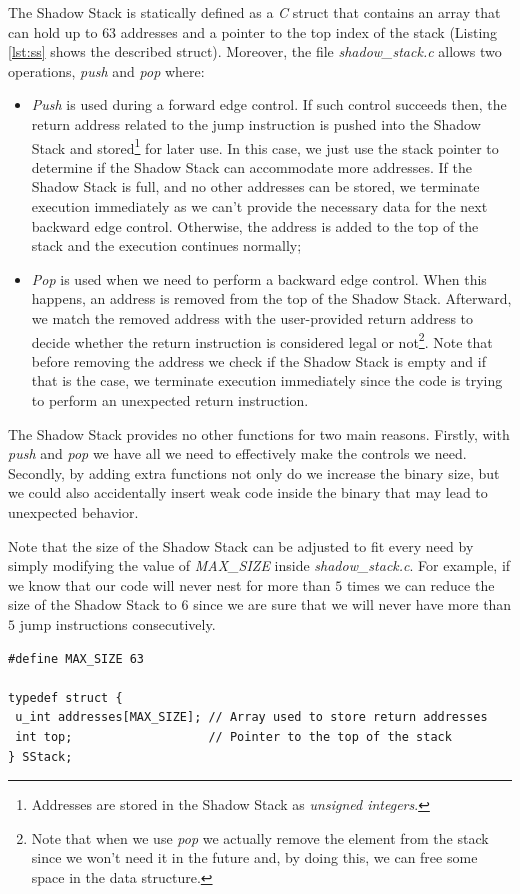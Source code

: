 The Shadow Stack is statically defined as a \textit{C} struct that contains an
array that can hold up to $63$ addresses and a pointer to the top index of the
stack (Listing \ref{lst:ss} shows the described struct). Moreover, the file
\textit{shadow\_stack.c} allows two operations, \textit{push} and \textit{pop}
where:
\begin{itemize}
  \item \textit{Push} is used during a forward edge control. If such control succeeds
    then, the return address related to the jump instruction is pushed into the
    Shadow Stack and stored\footnote{Addresses are stored in the Shadow Stack as
    \textit{unsigned integers}.} for later use. In this case, we just use the stack
    pointer to determine if the Shadow Stack can accommodate more addresses. If
    the Shadow Stack is full, and no other addresses can be stored, we terminate
    execution immediately as we can't provide the necessary data for the next
    backward edge control. Otherwise, the address is added to the top of the
    stack and the execution continues normally;

  \item \textit{Pop} is used when we need to perform a backward edge control. When
    this happens, an address is removed from the top of the Shadow Stack. Afterward,
    we match the removed address with the user-provided return address to decide
    whether the return instruction is considered legal or not\footnote{Note that
    when we use \textit{pop} we actually remove the element from the stack since
    we won't need it in the future and, by doing this, we can free some space in
    the data structure.}. Note that before removing the address we check if the
    Shadow Stack is empty and if that is the case, we terminate execution immediately
    since the code is trying to perform an unexpected return instruction.
\end{itemize}

The Shadow Stack provides no other functions for two main reasons. Firstly, with
\textit{push} and \textit{pop} we have all we need to effectively make the
controls we need. Secondly, by adding extra functions not only do we increase
the binary size, but we could also accidentally insert weak code inside the binary
that may lead to unexpected behavior.

Note that the size of the Shadow Stack can be adjusted to fit every need by simply
modifying the value of \textit{MAX\_SIZE} inside \textit{shadow\_stack.c}. For
example, if we know that our code will never nest for more than $5$ times we can
reduce the size of the Shadow Stack to $6$ since we are sure that we will never have
more than $5$ jump instructions consecutively. \\
\begin{lstlisting}[style=CStyle, caption = Shadow Stack definition inside \textit{shadow\_stack.c}, label={lst:ss}]
#define MAX_SIZE 63

typedef struct {
 u_int addresses[MAX_SIZE]; // Array used to store return addresses
 int top;                   // Pointer to the top of the stack
} SStack;
\end{lstlisting}

